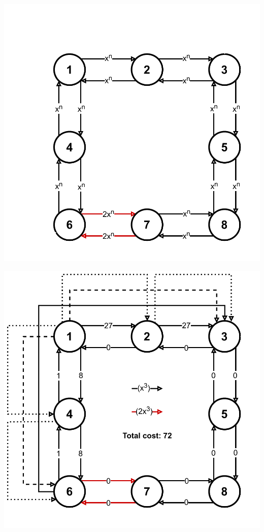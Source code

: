 {
    \begin{minipage}{0.3\textwidth}
        \includegraphics[width=\linewidth]{../Img/cex_init.pdf}
    \end{minipage}
    \begin{minipage}{0.3\textwidth}
        \includegraphics[width=\linewidth]{../Img/cex_greedy.pdf}

\end{minipage}}
